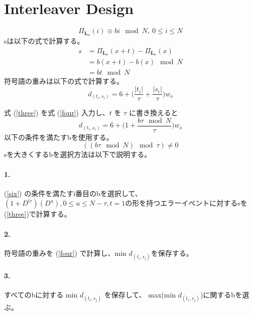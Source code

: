 \documentclass[20 pts]{article}
\begin{document}
	\section{Interleaver Design}
\begin{equation}
\Pi_{\mathbf{L}_n}(i) \equiv bi  \mod N, \ 0 \leq i \leq N
\label{linear}
\end{equation}
sは以下の式で計算する。
\begin{equation}
\begin{split}
s&=\Pi_{\mathbf{L}_n}(x+t)-\Pi_{\mathbf{L}_n}(x)\\
&=b(x+t)-b(x) \mod N\\
&=bt \mod N
\label{three}
\end{split}
\end{equation}
符号語の重みは以下の式で計算する。
\begin{equation}
d_{(t_i,s_i)}=6+\Bigg( \frac{ \left|t_i\right|}{\tau} + \frac{ \left|s_i\right|}{\tau} \Bigg)w_o 
\label{four}
\end{equation}

式 (\ref{three}) を式 (\ref{four}) 入力し、$t$ を $\tau$ に書き換えると
\begin{equation}
d_{(t_i,s_i)}=6+\Bigg( 1+ \frac{ b\tau \mod N}{\tau} \Bigg)w_o 
\label{five}
\end{equation}
以下の条件を満たすbを使用する。
\begin{equation}
( (b\tau \mod N )\mod \tau ) \neq 0
\label{six}
\end{equation}
sを大きくするbを選択方法は以下で説明する。

\paragraph{1.}  (\ref{six}) の条件を満たすi番目のbを選択して、$(1+D^{t\tau})(D^u) ,0\leq u\leq N-\tau, t=1$の形を持つエラーイベントに対するsを(\ref{three})で計算する。
\paragraph{2.} 符号語の重みを (\ref{four}) で計算し、min $d_{(t_i,s_j)}$を保存する。
\paragraph{3.}すべてのbに対する min $d_{(t_i,s_j)}$ を保存して、 max(min $d_{(t_i,s_j)}$)に関するbを選ぶ。
\end{document}
